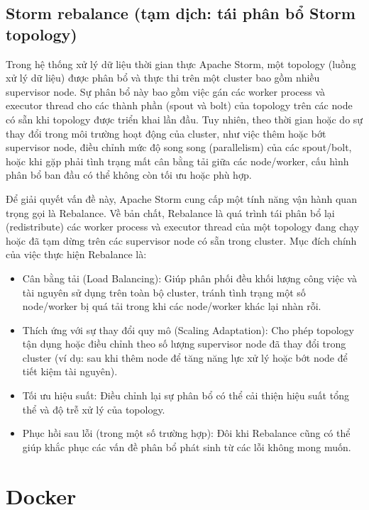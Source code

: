 \subsection{Storm rebalance (tạm dịch: tái phân bổ Storm topology)}

Trong hệ thống xử lý dữ liệu thời gian thực Apache Storm, một topology (luồng xử lý dữ liệu) được phân bổ và thực thi trên một cluster bao gồm nhiều supervisor node. Sự phân bổ này bao gồm việc gán các worker process và executor thread cho các thành phần (spout và bolt) của topology trên các node có sẵn khi topology được triển khai lần đầu. Tuy nhiên, theo thời gian hoặc do sự thay đổi trong môi trường hoạt động của cluster, như việc thêm hoặc bớt supervisor node, điều chỉnh mức độ song song (parallelism) của các spout/bolt, hoặc khi gặp phải tình trạng mất cân bằng tải giữa các node/worker, cấu hình phân bổ ban đầu có thể không còn tối ưu hoặc phù hợp.

Để giải quyết vấn đề này, Apache Storm cung cấp một tính năng vận hành quan trọng gọi là Rebalance. Về bản chất, Rebalance là quá trình tái phân bổ lại (redistribute) các worker process và executor thread của một topology đang chạy hoặc đã tạm dừng trên các supervisor node có sẵn trong cluster. Mục đích chính của việc thực hiện Rebalance là:

\begin{itemize}
    \item Cân bằng tải (Load Balancing): Giúp phân phối đều khối lượng công việc và tài nguyên sử dụng trên toàn bộ cluster, tránh tình trạng một số node/worker bị quá tải trong khi các node/worker khác lại nhàn rỗi.
    \item Thích ứng với sự thay đổi quy mô (Scaling Adaptation): Cho phép topology tận dụng hoặc điều chỉnh theo số lượng supervisor node đã thay đổi trong cluster (ví dụ: sau khi thêm node để tăng năng lực xử lý hoặc bớt node để tiết kiệm tài nguyên).
    \item Tối ưu hiệu suất: Điều chỉnh lại sự phân bổ có thể cải thiện hiệu suất tổng thể và độ trễ xử lý của topology.
    \item Phục hồi sau lỗi (trong một số trường hợp): Đôi khi Rebalance cũng có thể giúp khắc phục các vấn đề phân bổ phát sinh từ các lỗi không mong muốn.
\end{itemize}

\section{Docker}

